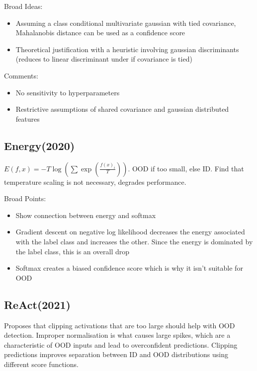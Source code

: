 \documentclass{article}
\begin{document}
            Broad Ideas:
            \begin{itemize}
                \item 
                    Assuming a class conditional multivariate gaussian with tied covariance, Mahalanobis distance can be used as a confidence score
                \item 
                    Theoretical justification with a heuristic involving gaussian discriminants (reduces to linear discriminant under if covariance is tied)
            \end{itemize}

            Comments:
            \begin{itemize}
                \item 
                    No sensitivity to hyperparameters
                \item 
                    Restrictive assumptions of shared covariance and gaussian distributed features
            \end{itemize}
        
        \subsection{Energy(2020)}
            $E(f, x) = -T \log(\sum \exp(\frac{f(x)_i}{T}))$. OOD if too small, else ID. Find that temperature scaling is not necessary, degrades performance. 
            
            Broad Points:
            \begin{itemize}
                \item 
                    Show connection between energy and softmax
                \item 
                    Gradient descent on negative log likelihood decreases the energy associated with the label class and increases the other. Since the energy is dominated by the label class, this is an overall drop
                \item 
                    Softmax creates a biased confidence score which is why it isn't suitable for OOD
            \end{itemize}
        \subsection{ReAct(2021)}
            Proposes that clipping activations that are too large should help with OOD detection. Improper normalisation is what causes large spikes, which are a characteristic of OOD inputs and lead to overconfident predictions. Clipping predictions improves separation between ID and OOD distributions using different score functions. 
            
\end{document}
